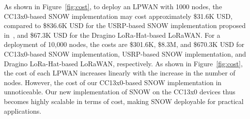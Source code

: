 As shown in Figure~\ref{fig:cost}, to deploy an LPWAN with 1000 nodes, the CC13x0-based SNOW implementation may cost approximately \$31.6K USD, compared to \$836.6K USD for the USRP-based SNOW implementation proposed in~\cite{snow_ton}, and \$67.3K USD for the Dragino LoRa-Hat-based LoRaWAN. 
For a deployment of 10,000 nodes, the costs are \$301.6K, \$8.3M, and \$670.3K USD
for CC13x0-based SNOW implementation, USRP-based SNOW implementation, and Dragino LoRa-Hat-based LoRaWAN, 
respectively. As shown in Figure~\ref{fig:cost}, the cost of each LPWAN increases linearly with the increase in the number of nodes. However, the cost of our CC13x0-based SNOW implementation in unnoticeable.
Our new implementation of SNOW on the CC13x0 devices thus becomes highly scalable in terms of cost, making SNOW deployable for practical applications.

